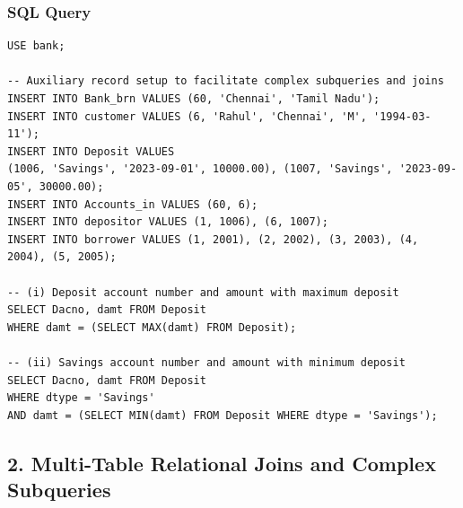 \subsubsection*{SQL Query}
\begin{lstlisting}[basicstyle=\ttfamily\footnotesize,caption={Auxiliary records setup and single-row aggregate subqueries (Queries i, ii)}]
USE bank;

-- Auxiliary record setup to facilitate complex subqueries and joins
INSERT INTO Bank_brn VALUES (60, 'Chennai', 'Tamil Nadu');
INSERT INTO customer VALUES (6, 'Rahul', 'Chennai', 'M', '1994-03-11');
INSERT INTO Deposit VALUES
(1006, 'Savings', '2023-09-01', 10000.00), (1007, 'Savings', '2023-09-05', 30000.00);
INSERT INTO Accounts_in VALUES (60, 6);
INSERT INTO depositor VALUES (1, 1006), (6, 1007);
INSERT INTO borrower VALUES (1, 2001), (2, 2002), (3, 2003), (4, 2004), (5, 2005);

-- (i) Deposit account number and amount with maximum deposit
SELECT Dacno, damt FROM Deposit
WHERE damt = (SELECT MAX(damt) FROM Deposit);

-- (ii) Savings account number and amount with minimum deposit
SELECT Dacno, damt FROM Deposit
WHERE dtype = 'Savings'
AND damt = (SELECT MIN(damt) FROM Deposit WHERE dtype = 'Savings');
\end{lstlisting}

\newpage

\subsection*{2. Multi-Table Relational Joins and Complex Subqueries}

